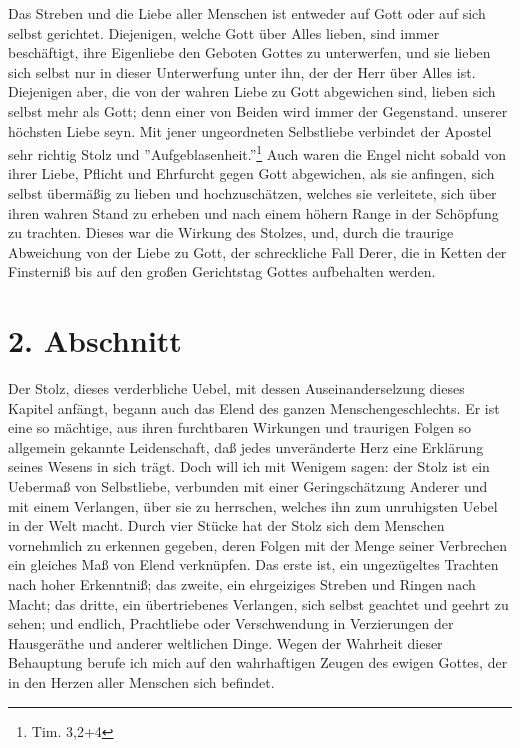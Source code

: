 \medskip

Das Streben und die Liebe aller Menschen ist entweder auf Gott oder auf sich
selbst gerichtet. Diejenigen, welche Gott über Alles lieben, sind immer
beschäftigt, ihre Eigenliebe den Geboten Gottes zu unterwerfen, und sie lieben
sich selbst nur in dieser Unterwerfung unter ihn, der der Herr über Alles ist.
Diejenigen aber, die von der wahren Liebe zu Gott abgewichen sind, lieben sich
selbst mehr als Gott; denn einer von Beiden wird immer der Gegenstand. unserer
höchsten Liebe seyn. Mit jener ungeordneten Selbstliebe verbindet der Apostel
sehr richtig Stolz und ''Aufgeblasenheit.''\footnote{Tim. 3,2+4} Auch waren die
Engel nicht sobald von ihrer Liebe, Pflicht und Ehrfurcht gegen Gott abgewichen,
als sie anfingen, sich selbst übermäßig zu lieben und hochzuschätzen, welches
sie verleitete, sich über ihren wahren Stand zu erheben und nach einem höhern
Range in der Schöpfung zu trachten. Dieses war die Wirkung des Stolzes, und,
durch die traurige Abweichung von der Liebe zu Gott, der schreckliche Fall
Derer, die in Ketten der Finsterniß bis auf den großen Gerichtstag Gottes
aufbehalten werden.

\section{2. Abschnitt} \label{kap7_ab2}

Der Stolz, dieses verderbliche Uebel, mit dessen Auseinanderselzung dieses
Kapitel anfängt, begann auch das Elend des ganzen Menschengeschlechts. Er ist
eine so mächtige, aus ihren furchtbaren Wirkungen und traurigen Folgen so
allgemein gekannte Leidenschaft, daß jedes unveränderte Herz eine Erklärung
seines Wesens in sich trägt. Doch will ich mit Wenigem sagen: der Stolz ist ein
Uebermaß von Selbstliebe, verbunden mit einer Geringschätzung Anderer und mit
einem Verlangen, über sie zu herrschen, welches ihn zum unruhigsten Uebel in der
Welt macht. Durch vier Stücke hat der Stolz sich dem Menschen vornehmlich zu
erkennen gegeben, deren Folgen mit der Menge seiner Verbrechen ein gleiches Maß
von Elend verknüpfen. Das erste ist, ein ungezügeltes Trachten nach hoher
Erkenntniß; das zweite, ein ehrgeiziges Streben und Ringen nach Macht; das
dritte, ein übertriebenes Verlangen, sich selbst geachtet und geehrt zu sehen;
und endlich, Prachtliebe oder Verschwendung in Verzierungen der Hausgeräthe und
anderer weltlichen Dinge. Wegen der Wahrheit dieser Behauptung berufe ich mich
auf den wahrhaftigen Zeugen des ewigen Gottes, der in den Herzen aller Menschen
sich befindet.

